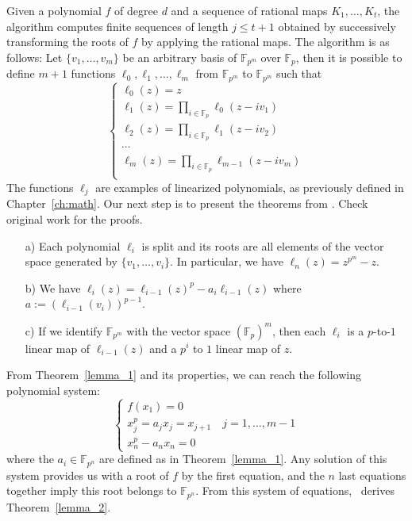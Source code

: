 Given a polynomial $f$ of degree $d$ and a sequence of rational maps $K_1,\ldots, K_t$, the algorithm computes finite sequences of length $j \leq t+1$ obtained by successively transforming the roots of $f$ by applying the rational maps. The algorithm is as follows: Let $\{v_1,\ldots,v_m\}$ be an arbitrary basis of $\mathbb{F}_{p^m}$ over $\mathbb{F}_p$, then it is possible to define $m+1$ functions $\ell_0, \ell_1,\ldots, \ell_m$ from $\mathbb{F}_{p^m}$ to $\mathbb{F}_{p^m}$ such that
$$
\left \{
\begin{array}{l}
     \ell_0(z) = z\\
     \ell_1(z) = \prod_{i\in \mathbb{F}_p}\ell_0(z-iv_1)\\
     \ell_2(z) = \prod_{i\in \mathbb{F}_p}\ell_1(z-iv_2)\\
     \cdots \\
     \ell_m(z) = \prod_{i\in \mathbb{F}_p}\ell_{m-1}(z-iv_m)\\
\end{array}
\right.
$$
The functions $\ell_j$ are examples of linearized polynomials, as previously defined in Chapter~\ref{ch:math}. Our next step is to present the theorems from \cite{petit2014finding}. Check original work for the proofs.
\begin{theorem}\label{lemma_1}
\begin{itemize}
    \item[a)] Each polynomial $\ell_i$ is split and its roots are all elements of the vector space generated by $\{v_1, \ldots,v_i\}$. In particular, we have $\ell_n(z) = z^{p^m} -z$.
    \item[b)] We have $\ell_i(z)  = \ell_{i-1}(z)^p - a_i\ell_{i-1}(z)$ where $a := (\ell_{i-1}(v_i))^{p-1}$.
    \item[c)] If we identify $\mathbb{F}_{p^m}$ with the vector space $(\mathbb{F}_p)^m$, then each $\ell_i$ is a $p$-to-$1$ linear map of $\ell_{i-1}(z)$ and a $p^i$ to $1$ linear map of $z$.
\end{itemize}
\end{theorem}

From Theorem~\ref{lemma_1} and its properties, we can reach the following polynomial system:
\begin{equation}\label{eq:system_1}
    \left \{
\begin{array}{l}
    f(x_1) = 0\\
     x_j^p = a_jx_j = x_{j+1} \quad j=1,\ldots, m-1\\
     x_n^p - a_nx_n = 0
\end{array}
\right.
\end{equation}
where the $a_i \in \mathbb{F}_{p^n}$ are defined as in Theorem~\ref{lemma_1}. Any solution of this system provides us with a root of $f$ by the first equation, and the $n$ last equations together imply this root belongs to $\mathbb{F}_{p^n}$. From this system of equations,~\cite{petit2014finding} derives Theorem~\ref{lemma_2}.

